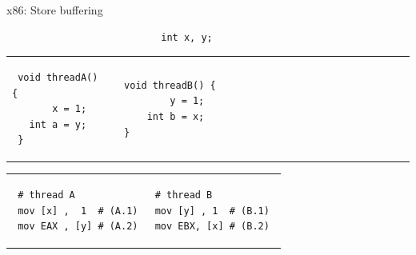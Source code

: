  \begin{frame}[fragile,t]{x86: Store buffering}
 
 
 \begin{verbatim}
                           int x, y;
 \end{verbatim}
 
 \begin{tabular}{p{} p{}}
 
 \begin{verbatim}
 void threadA() {
       x = 1;
   int a = y;
 }
 \end{verbatim}
 
 & 
 
 \begin{verbatim}
 void threadB() {                                   
         y = 1;                           
     int b = x;                           
 }                    
 \end{verbatim}
 \end{tabular}
 
 
 \pause
 
 \begin{tabular}{p{} p{}}
 \begin{verbatim}
 # thread A
 mov [x] ,  1  # (A.1)
 mov EAX , [y] # (A.2)
 \end{verbatim}
 
 & 
 
 \begin{verbatim}
 # thread B          
 mov [y] , 1  # (B.1) 
 mov EBX, [x] # (B.2) 
 \end{verbatim}
 \end{tabular}
 
 \end{frame}
 

